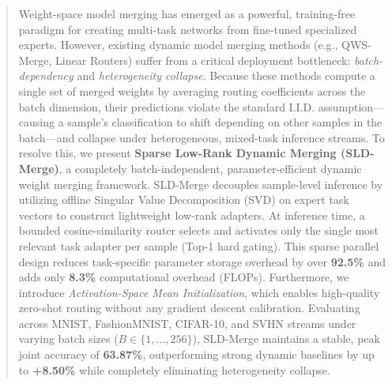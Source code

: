 \begin{abstract}
Weight-space model merging has emerged as a powerful, training-free paradigm for creating multi-task networks from fine-tuned specialized experts. However, existing dynamic model merging methods (e.g., QWS-Merge, Linear Routers) suffer from a critical deployment bottleneck: \emph{batch-dependency} and \emph{heterogeneity collapse}. Because these methods compute a single set of merged weights by averaging routing coefficients across the batch dimension, their predictions violate the standard I.I.D. assumption—causing a sample's classification to shift depending on other samples in the batch—and collapse under heterogeneous, mixed-task inference streams. 
To resolve this, we present \textbf{Sparse Low-Rank Dynamic Merging (SLD-Merge)}, a completely batch-independent, parameter-efficient dynamic weight merging framework. SLD-Merge decouples sample-level inference by utilizing offline Singular Value Decomposition (SVD) on expert task vectors to construct lightweight low-rank adapters. At inference time, a bounded cosine-similarity router selects and activates only the single most relevant task adapter per sample (Top-1 hard gating). This sparse parallel design reduces task-specific parameter storage overhead by over \textbf{92.5\%} and adds only \textbf{8.3\%} computational overhead (FLOPs). Furthermore, we introduce \emph{Activation-Space Mean Initialization}, which enables high-quality zero-shot routing without any gradient descent calibration. Evaluating across MNIST, FashionMNIST, CIFAR-10, and SVHN streams under varying batch sizes ($B \in \{1, \dots, 256\}$), SLD-Merge maintains a stable, peak joint accuracy of \textbf{63.87\%}, outperforming strong dynamic baselines by up to \textbf{+8.50\%} while completely eliminating heterogeneity collapse.
\end{abstract}
